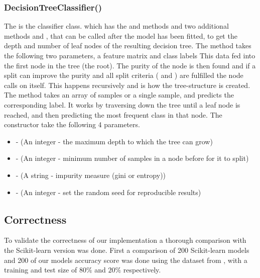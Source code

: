 \subsubsection{DecisionTreeClassifier()}
The  is the classifier class.
which has the  and  methods and two additional  methods  and , that can be called after the model has been fitted, to get the depth and number of leaf nodes of the resulting decision tree.
The  method takes the following two parameters, a feature matrix  and class labels 
This data fed into the first node in the tree (the root).
The purity of the node is then found and if a split can improve the purity and all split criteria ( and ) are fulfilled the node calls  on itself.
This happens recursively and is how the tree-structure is created.
The  method takes an array of samples or a single sample, and predicts the corresponding label.
It works by traversing down the tree until a leaf node is reached, and then predicting the most frequent class in that node.
The constructor take the following 4 parameters.\\
\begin{itemize}
    \item {} - (An integer - the maximum depth to which the tree can grow)
    \item {} - (An integer - minimum number of samples in a node before for it to split)
    \item {} - (A string - impurity measure (gini or entropy))
    \item {} - (An integer - set the random seed for reproducible results)
    \end{itemize}
\vspace{10pt}

\subsection{Correctness}
To validate the correctness of our implementation a thorough comparison with the Scikit-learn version was done.
First a comparison of 200 Scikit-learn models and 200 of our models accuracy score was done using the  dataset from , with a training and test size of $80\%$ and $20\%$ respectively.

